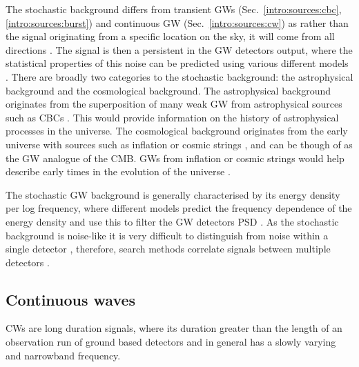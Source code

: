 The stochastic background differs from transient \glspl{GW} (Sec.~\ref{intro:sources:cbc}, \ref{intro:sources:burst}) and continuous \gls{GW} (Sec.~\ref{intro:sources:cw}) as rather than the signal originating from a specific location on the sky, it will come from all directions \citep{christensen2018StochasticGravitational}. 
The signal is then a persistent in the \gls{GW} detectors output, where the statistical properties of this noise can be predicted using various different models \citep{christensen2018StochasticGravitational}.   
There are broadly two categories to the stochastic background: the astrophysical background and the cosmological background. 
The astrophysical background originates from the superposition of many weak \gls{GW} from astrophysical sources such as \glspl{CBC} \citep{regimbau2011AstrophysicalGravitational}. 
This would provide information on the history of astrophysical processes in the universe.
The cosmological background originates from the early universe with sources such as inflation or cosmic strings \citep{maggiore2000GravitationalWave}, and can be though of as the \gls{GW} analogue of the \gls{CMB}.
\glspl{GW} from inflation or cosmic strings would help describe early times in the evolution of the universe \citep{christensen2018StochasticGravitational}.

The stochastic \gls{GW} background is generally characterised by its energy density per log frequency, where different models predict the frequency dependence of the energy density and use this to filter the \gls{GW} detectors \gls{PSD} \citep{allen1999DetectingStochastic}.
As the stochastic background is noise-like it is very difficult to distinguish from noise within a single detector \citep{christensen2018StochasticGravitational}, therefore, search methods correlate signals between multiple detectors
\citep{romano2019SearchesStochastic,christensen2018StochasticGravitational,allen1999DetectingStochastic}.


\subsection{\label{intro:sources:cw}Continuous waves}

\glspl{CW} are long duration signals, where its duration greater than
the length of an observation run of ground based detectors and in general has a slowly varying and narrowband frequency. 

